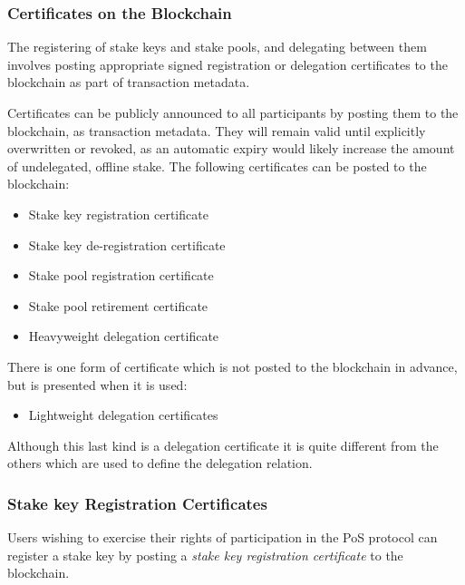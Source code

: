 \documentclass[11pt,a4paper]{article}
\begin{document}
\subsubsection{Certificates on the
Blockchain}\label{certificates-on-the-blockchain}

The registering of stake keys and stake pools, and delegating between
them involves posting appropriate signed registration or delegation
certificates to the blockchain as part of transaction metadata.

Certificates can be publicly announced to all participants by posting
them to the blockchain, as transaction metadata. They will remain valid
until explicitly overwritten or revoked, as an automatic expiry would
likely increase the amount of undelegated, offline stake. The following
certificates can be posted to the blockchain:

\begin{itemize}
\item
  Stake key registration certificate
\item
  Stake key de-registration certificate
\item
  Stake pool registration certificate
\item
  Stake pool retirement certificate
\item
  Heavyweight delegation certificate
\end{itemize}

There is one form of certificate which is not posted to the blockchain
in advance, but is presented when it is used:

\begin{itemize}
\item
  Lightweight delegation certificates
\end{itemize}

Although this last kind is a delegation certificate it is quite
different from the others which are used to define the delegation
relation.

\subsubsection{Stake key Registration
Certificates}\label{stake-key-registration-certificates}

Users wishing to exercise their rights of participation in the PoS
protocol can register a stake key by posting a \emph{stake key
registration certificate} to the blockchain.
\end{document}
